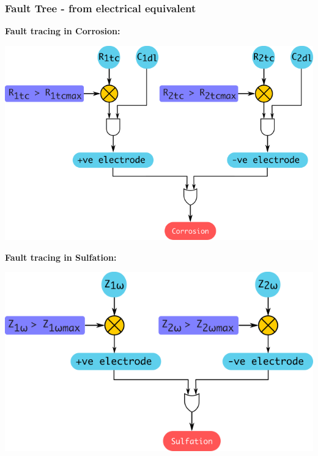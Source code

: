 \documentclass{beamer}
\begin{document}
\begin{frame}[label=analysis]     %
  \frametitle{Fault Tree - from electrical equivalent}
  \fontsize{8pt}{10}\selectfont
  \begin{center}
    \hyperlink{electrical_equivalent}{}
  \end{center}
  \vspace{-8pt}
  \textbf{Fault tracing in Corrosion:}
  \vspace{-10pt}
  \begin{center}
    \includegraphics[width=0.55\linewidth]{./Resources/Images/analysis_faulttree_corrosion.png}
  \end{center}
  \vspace{-15pt}
  \textbf{Fault tracing in Sulfation:}
  \vspace{-10pt}  
  \begin{center}
    \includegraphics[width=0.55\linewidth]{./Resources/Images/analysis_faulttree_sulfation.png}
  \end{center}
\end{frame}
\end{document}
